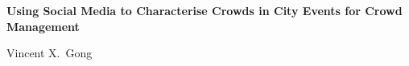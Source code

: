 \graphicspath{{./ch-x-others/images/}}



\newcommand{\thetitle}{Using Social Media to Characterise Crowds in City Events for Crowd Management} 
\newcommand{\thesubtitle}{} 
\newcommand{\theauthor}{Vincent X.\ Gong}


\pagestyle{fancy} %
\thispagestyle{empty}
\vspace*{30mm}

\begin{center}
    \textbf{\huge \thetitle}\\[\baselineskip]\textbf{\LARGE \thesubtitle}
\end{center}


\vspace{40mm}

\begin{center}
    \Large\theauthor
\end{center}

\newpage

\thispagestyle{empty}

\vspace*{\fill}



